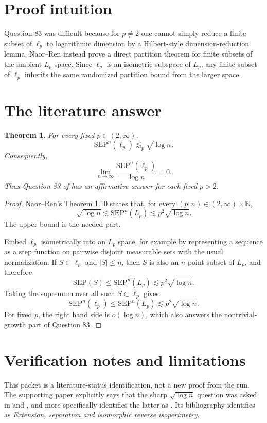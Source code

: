 \documentclass[11pt]{article}
\newtheorem{theorem}{Theorem}
\newcommand{\SEP}{\mathrm{SEP}}
\begin{document}
\section*{Proof intuition}

Question 83 was difficult because for \(p\neq 2\) one cannot simply reduce a
finite subset of \(\ell_p\) to logarithmic dimension by a Hilbert-style
dimension-reduction lemma.  Naor--Ren instead prove a direct partition theorem
for finite subsets of the ambient \(L_p\) space.  Since \(\ell_p\) is an
isometric subspace of \(L_p\), any finite subset of \(\ell_p\) inherits the
same randomized partition bound from the larger space.

\section*{The literature answer}

\begin{theorem}
For every fixed \(p\in(2,\infty)\),
\[
  \SEP^n(\ell_p)\lesssim_p \sqrt{\log n}.
\]
Consequently,
\[
  \lim_{n\to\infty}\frac{\SEP^n(\ell_p)}{\log n}=0.
\]
Thus Question 83 of \cite{Naor2024} has an affirmative answer for each fixed
\(p>2\).
\end{theorem}

\begin{proof}
Naor--Ren's Theorem 1.10 \cite{NaorRen} states that, for every
\((p,n)\in(2,\infty)\times\mathbb{N}\),
\[
  \sqrt{\log n}\lesssim \SEP^n(L_p)\lesssim p^2\sqrt{\log n}.
\]
The upper bound is the needed part.

Embed \(\ell_p\) isometrically into an \(L_p\) space, for example by
representing a sequence as a step function on pairwise disjoint measurable
sets with the usual normalization.  If \(S\subset \ell_p\) and \(|S|\le n\),
then \(S\) is also an \(n\)-point subset of \(L_p\), and therefore
\[
  \SEP(S)\le \SEP^n(L_p)\lesssim p^2\sqrt{\log n}.
\]
Taking the supremum over all such \(S\subset \ell_p\) gives
\[
  \SEP^n(\ell_p)\le \SEP^n(L_p)\lesssim p^2\sqrt{\log n}.
\]
For fixed \(p\), the right hand side is \(o(\log n)\), which also answers the
nontrivial-growth part of Question 83.
\end{proof}

\section*{Verification notes and limitations}

This packet is a literature-status identification, not a new proof from the
run.  The supporting paper explicitly says that the sharp
\(\sqrt{\log n}\) question was asked in \cite{Naor2017} and
\cite{Naor2024}, and more specifically identifies the latter as
\cite[Question 83]{Naor2024}.  Its bibliography identifies
\cite{Naor2024} as \emph{Extension, separation and isomorphic reverse
isoperimetry}.
\end{document}

